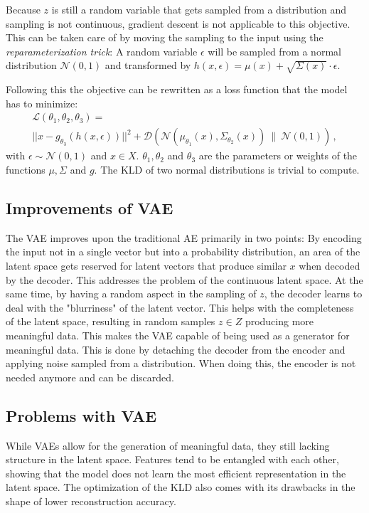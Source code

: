\documentclass[a4paper]{IEEEtran}
\begin{document}
{Because $z$ is still a random variable that gets sampled from a distribution and sampling is not continuous, gradient descent is not applicable to this objective. This can be taken care of by moving the sampling to the input using the \textit{reparameterization trick}: A random variable $\epsilon$ will be sampled from a normal distribution $\mathcal{N}(0,1)$ and transformed by $h(x, \epsilon) = \mu(x) + \sqrt{\Sigma(x)} \cdot \epsilon$. 

Following this the objective can be rewritten as a loss function that the model has to minimize:
\begin{gather}
	\mathcal{L}(\theta_1, \theta_2, \theta_3) = \\ 
	||x - g_{\theta_3}(h(x, \epsilon))||^2 + \mathcal{D}(\mathcal{N}(\mu_{\theta_1}(x), \Sigma_{\theta_2}(x)) \ \| \ \mathcal{N}(0, 1))\,,
	\label{vae_loss}
\end{gather}
with $\epsilon \sim \mathcal{N}(0,1)$ and $x \in X$. $\theta_1, \theta_2$ and $\theta_3$ are the parameters or weights of the functions $\mu, \Sigma$ and $g$. The KLD of two normal distributions is trivial to compute.

\subsection{Improvements of VAE}
The VAE improves upon the traditional AE primarily in two points:
By encoding the input not in a single vector but into a probability distribution, an area of the latent space gets reserved for latent vectors that produce similar $x$ when decoded by the decoder. This addresses the problem of the continuous latent space. At the same time, by having a random aspect in the sampling of $z$, the decoder learns to deal with the "blurriness" of the latent vector. This helps with the completeness of the latent space, resulting in random samples $z \in Z$ producing more meaningful data. This makes the VAE capable of being used as a generator for meaningful data. This is done by detaching the decoder from the encoder and applying noise sampled from a distribution. When doing this, the encoder is not needed anymore and can be discarded.

\subsection{Problems with VAE}
While VAEs allow for the generation of meaningful data, they still lacking structure in the latent space. Features tend to be entangled with each other, showing that the model does not learn the most efficient representation in the latent space. The optimization of the KLD also comes with its drawbacks in the shape of lower reconstruction accuracy. 

}
\end{document}
